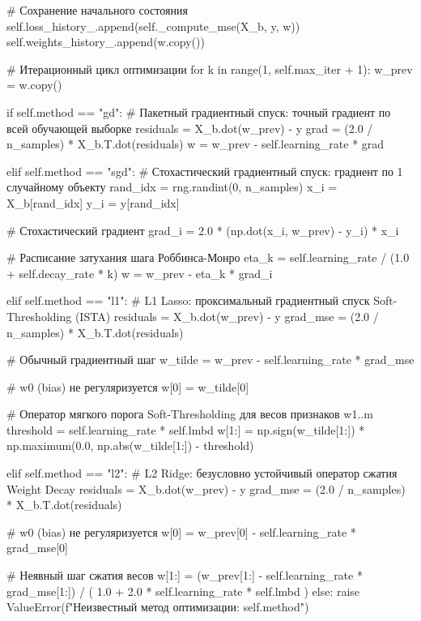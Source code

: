 \documentclass[14pt,a4paper]{extarticle}
\begin{document}
\begin{CodeListing}
        # Сохранение начального состояния
        self.loss_history_.append(self._compute_mse(X_b, y, w))
        self.weights_history_.append(w.copy())

        # Итерационный цикл оптимизации
        for k in range(1, self.max_iter + 1):
            w_prev = w.copy()

            if self.method == "gd":
                # Пакетный градиентный спуск: точный градиент по всей обучающей выборке
                residuals = X_b.dot(w_prev) - y
                grad = (2.0 / n_samples) * X_b.T.dot(residuals)
                w = w_prev - self.learning_rate * grad

            elif self.method == "sgd":
                # Стохастический градиентный спуск: градиент по 1 случайному объекту
                rand_idx = rng.randint(0, n_samples)
                x_i = X_b[rand_idx]
                y_i = y[rand_idx]

                # Стохастический градиент
                grad_i = 2.0 * (np.dot(x_i, w_prev) - y_i) * x_i

                # Расписание затухания шага Роббинса-Монро
                eta_k = self.learning_rate / (1.0 + self.decay_rate * k)
                w = w_prev - eta_k * grad_i

            elif self.method == "l1":
                # L1 Lasso: проксимальный градиентный спуск Soft-Thresholding (ISTA)
                residuals = X_b.dot(w_prev) - y
                grad_mse = (2.0 / n_samples) * X_b.T.dot(residuals)

                # Обычный градиентный шаг
                w_tilde = w_prev - self.learning_rate * grad_mse

                # w0 (bias) не регуляризуется
                w[0] = w_tilde[0]

                # Оператор мягкого порога Soft-Thresholding для весов признаков w1..m
                threshold = self.learning_rate * self.lmbd
                w[1:] = np.sign(w_tilde[1:]) * np.maximum(0.0, np.abs(w_tilde[1:]) - threshold)

            elif self.method == "l2":
                # L2 Ridge: безусловно устойчивый оператор сжатия Weight Decay
                residuals = X_b.dot(w_prev) - y
                grad_mse = (2.0 / n_samples) * X_b.T.dot(residuals)

                # w0 (bias) не регуляризуется
                w[0] = w_prev[0] - self.learning_rate * grad_mse[0]

                # Неявный шаг сжатия весов
                w[1:] = (w_prev[1:] - self.learning_rate * grad_mse[1:]) / (
                    1.0 + 2.0 * self.learning_rate * self.lmbd
                )
            else:
                raise ValueError(f"Неизвестный метод оптимизации: {self.method}")


\end{CodeListing}
\end{document}
